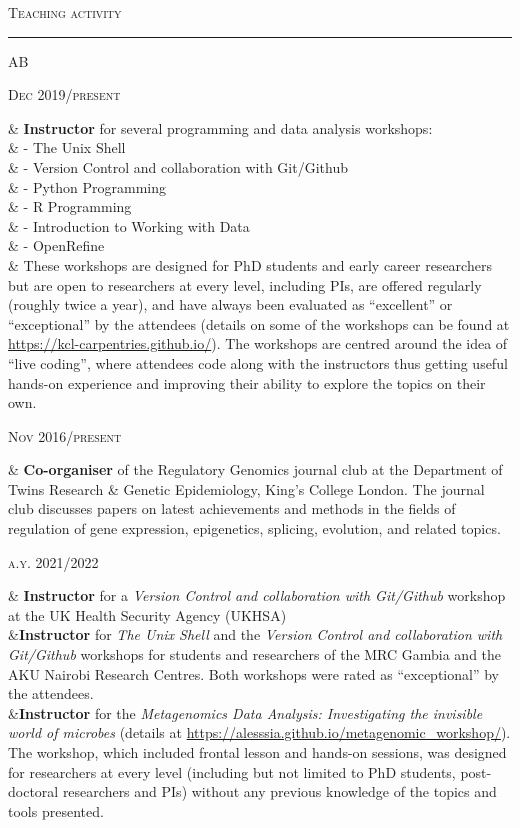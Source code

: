 \documentclass[a4paper,10pt]{article}
\newcommand{\mediumtitle}[1]{
	\vspace{0.2cm}
	{\noindent
	\Large \textsc{#1}\\[-2ex]
	\hrule
	\vspace{0.2cm}}
}
\newenvironment{doubletablelist}
{
	\vspace{-0.2cm}
	\begin{longtable}[!h]{AB}}{\end{longtable}
}
\newcommand{\dtlist}[2]{
\hspace{-3cm}
\noindent
	\begin{minipage}{0.22\textwidth}
	\begin{flushright}
	\textsc{#1}
	\end{flushright}
	\end{minipage}
	& #2\\[0.2cm]
}
\begin{document}
\mediumtitle{Teaching activity}
\begin{doubletablelist}
	
	\dtlist{Dec 2019/present}{\textbf{Instructor} for several programming and data analysis workshops:\\
							& \hskip1cm - The Unix Shell\\
							& \hskip1cm - Version Control and collaboration with Git/Github\\
							& \hskip1cm - Python Programming\\
							& \hskip1cm - R Programming\\
							& \hskip1cm - Introduction to Working with Data\\
							& \hskip1cm - OpenRefine\\
							& These workshops are designed for PhD students and early career researchers but are open to researchers at every level, including PIs, are offered regularly (roughly twice a year), and have always been evaluated as ``excellent'' or ``exceptional'' by the attendees (details on some of the workshops can be found at \url{https://kcl-carpentries.github.io/}). The workshops are centred around the idea of ``live coding'', where attendees code along with the instructors thus getting useful hands-on experience and improving their ability to explore the topics on their own. }				
	
	\dtlist{Nov 2016/present}{\textbf{Co-organiser} of the Regulatory Genomics journal club at the Department of Twins Research \& Genetic Epidemiology, King's College London. The journal club discusses papers on latest achievements and methods in the fields of regulation of gene expression, epigenetics, splicing, evolution, and related topics. }
	
	\dtlist{a.y. 2021/2022}{ \textbf{Instructor} for a \emph{Version Control and collaboration with Git/Github} workshop at the UK Health Security Agency (UKHSA)\\
							&\textbf{Instructor} for \emph{The Unix Shell} and the \emph{Version Control and collaboration with Git/Github} workshops for students and researchers of the MRC Gambia and the AKU Nairobi Research Centres. Both workshops were rated as ``exceptional'' by the attendees.  \\
							&\textbf{Instructor} for the \emph{Metagenomics Data Analysis: Investigating the invisible world of microbes} (details at \url{https://alesssia.github.io/metagenomic_workshop/}). The workshop, which included frontal lesson and hands-on sessions, was designed for researchers at every level (including but not limited to PhD students, post-doctoral researchers and PIs) without any previous knowledge of the topics and tools presented.}


\end{doubletablelist}
\end{document}
